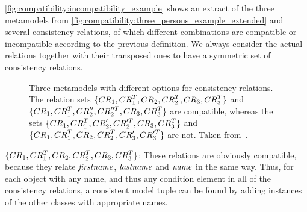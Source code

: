 \begin{example}
\autoref{fig:compatibility:incompatibility_example} shows an extract of the three metamodels from \autoref{fig:compatibility:three_persons_example_extended} and several consistency relations, of which different combinations are compatible or incompatible according to the previous definition.
We always consider the actual relations together with their transposed ones to have a symmetric set of consistency relations.

\begin{figure}
    \centering
    
    \caption[Different incompatibility scenarios]{Three metamodels with different options for consistency relations. The relation sets $\setted{\consistencyrelation{CR}{1}, \consistencyrelation{CR}{1}^T,\consistencyrelation{CR}{2}, \consistencyrelation{CR}{2}^T, \consistencyrelation{CR}{3}, \consistencyrelation{CR}{3}^T}$ and $\setted{\consistencyrelation{CR}{1}, \consistencyrelation{CR}{1}^T, \consistencyrelation{CR}{2}'', \consistencyrelation{CR}{2}''^T, \consistencyrelation{CR}{3}, \consistencyrelation{CR}{3}^T}$ are compatible, whereas the sets $\setted{\consistencyrelation{CR}{1}, \consistencyrelation{CR}{1}^T, \consistencyrelation{CR}{2}', \consistencyrelation{CR}{2}'^T, \consistencyrelation{CR}{3}, \consistencyrelation{CR}{3}^T}$ and $\setted{\consistencyrelation{CR}{1}, \consistencyrelation{CR}{1}^T, \consistencyrelation{CR}{2}, \consistencyrelation{CR}{2}^T, \consistencyrelation{CR}{3}', \consistencyrelation{CR}{3}'^T}$ are not. Taken from~.}
    \label{fig:compatibility:incompatibility_example}
\end{figure}

\begin{properdescription}
\item[$\setted{\consistencyrelation{CR}{1}, \consistencyrelation{CR}{1}^T,\consistencyrelation{CR}{2}, \consistencyrelation{CR}{2}^T, \consistencyrelation{CR}{3}, \consistencyrelation{CR}{3}^T}$:]
These relations are obviously compatible, because they relate $\mathit{firstname}$, $\mathit{lastname}$ and $\mathit{name}$ in the same way. Thus, for each object with any name, and thus any condition element in all of the consistency relations, a consistent model tuple can be found by adding instances of the other classes with appropriate names.


\end{properdescription}
\end{example}

